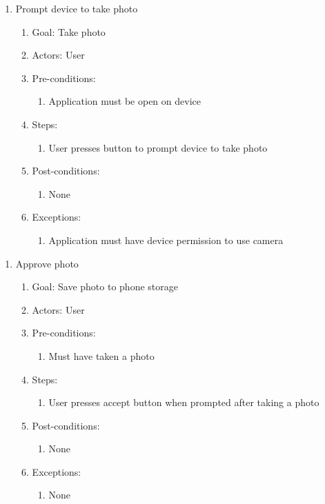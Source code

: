 \documentclass{scu-thesis}
\begin{document}
\begin{enumerate}
    \item Prompt device to take photo
    \begin{enumerate}
        \item Goal: Take photo
        \item Actors: User
        \item Pre-conditions: 
            \begin{enumerate}
                \item Application must be open on device
            \end{enumerate}
        \item Steps:
            \begin{enumerate}
                \item User presses button to prompt device to take photo
            \end{enumerate}
        \item Post-conditions:
            \begin{enumerate}
                \item None
            \end{enumerate}
        \item Exceptions:
            \begin{enumerate}
                \item Application must have device permission to use camera
            \end{enumerate}
    \end{enumerate}
\end{enumerate}

\begin{enumerate}
    \item Approve photo
    \begin{enumerate}
        \item Goal: Save photo to phone storage
        \item Actors: User
        \item Pre-conditions: 
            \begin{enumerate}
                \item Must have taken a photo
            \end{enumerate}
        \item Steps:
            \begin{enumerate}
                \item User presses accept button when prompted after taking a photo
            \end{enumerate}
        \item Post-conditions:
            \begin{enumerate}
                \item None
            \end{enumerate}
        \item Exceptions:
            \begin{enumerate}
                \item None
            \end{enumerate}
    \end{enumerate}
\end{enumerate}
\end{document}
